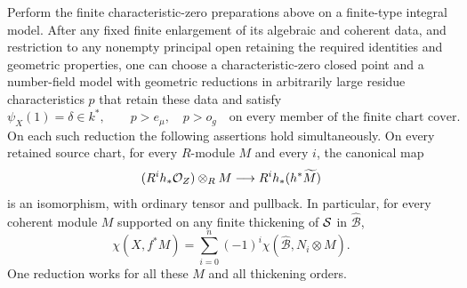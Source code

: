 \begin{proposition}\label{bc:ordinary}
Perform the finite characteristic-zero preparations above on a
finite-type integral model.  After any fixed finite enlargement of its
algebraic and coherent data, and restriction to any nonempty principal
open retaining the required identities and geometric properties, one can
choose a characteristic-zero closed point and a number-field model with
geometric reductions in arbitrarily large residue characteristics $p$
that retain these data and satisfy
\[
 \psi_X(1)=\delta\in k^*,\qquad
 p>e_\mu,\quad p>o_g
       \quad\text{on every member of the finite chart cover}.
\]
On each such reduction the following assertions hold simultaneously.
On every retained source chart, for every
$R$-module $M$ and every $i$, the canonical map
\begin{equation}\label{bc:canonical-base-change}
 (R^ih_*\mathcal O_Z)\otimes_RM\longrightarrow
                          R^ih_*(h^*\widetilde M)
\end{equation}
is an isomorphism, with ordinary tensor and pullback.  In particular,
for every coherent module $M$ supported on any finite thickening of
$\mathcal S$ in $\widehat{\mathcal B}$,
\begin{equation}\label{bc:ordinary-euler}
 \chi(X,f^*M)=\sum_{i=0}^n(-1)^i
                \chi(\widehat{\mathcal B},N_i\otimes M).
\end{equation}
One reduction works for all these $M$ and all thickening orders.
\end{proposition}


